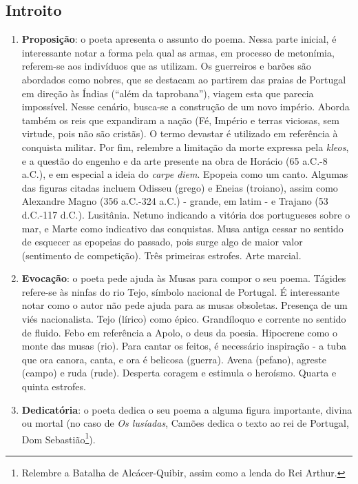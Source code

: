 \documentclass[12pt]{book}
\begin{document}
				\subsection{Introito} 			
 				\begin{enumerate}
 					\item \textbf{Proposição}: o poeta apresenta o assunto do poema. Nessa parte inicial, é interessante notar a forma pela qual as armas, em processo de metonímia, referem-se aos indivíduos que as utilizam. Os guerreiros e barões são abordados como nobres, que se destacam ao partirem das praias de Portugal em direção às Índias (``além da taprobana''), viagem esta que parecia impossível. Nesse cenário, busca-se a construção de um novo império. Aborda também os reis que expandiram a nação (Fé, Império e terras viciosas, sem virtude, pois não são cristãs). O termo devastar é utilizado em referência à conquista militar. Por fim, relembre a limitação da morte expressa pela \textit{kleos}, e a questão do engenho e da arte presente na obra de Horácio (65 a.C.-8 a.C.), e em especial a ideia do \textit{carpe diem}. Epopeia como um canto. Algumas das figuras citadas incluem Odisseu (grego) e Eneias (troiano), assim como Alexandre Magno (356 a.C.-324 a.C.) - grande, em latim - e Trajano (53 d.C.-117 d.C.). Lusitânia. Netuno indicando a vitória dos portugueses sobre o mar, e Marte como indicativo das conquistas. Musa antiga cessar no sentido de esquecer as epopeias do passado, pois surge algo de maior valor (sentimento de competição). Três primeiras estrofes. Arte marcial.
 					\item \textbf{Evocação}: o poeta pede ajuda às Musas para compor o seu poema. Tágides refere-se às ninfas do rio Tejo, símbolo nacional de Portugal. É interessante notar como o autor não pede ajuda para as musas obsoletas. Presença de um viés nacionalista. Tejo (lírico) como épico. Grandíloquo e corrente no sentido de fluido. Febo em referência a Apolo, o deus da poesia. Hipocrene como o monte das musas (rio). Para cantar os feitos, é necessário inspiração - a tuba que ora canora, canta, e ora é belicosa (guerra). Avena (pefano), agreste (campo) e ruda (rude). Desperta coragem e estimula o heroísmo. Quarta e quinta estrofes.
 					\item \textbf{Dedicatória}: o poeta dedica o seu poema a alguma figura importante, divina ou mortal (no caso de \textit{Os lusíadas}, Camões dedica o texto ao rei de Portugal, Dom Sebastião\footnote{Relembre a Batalha de Alcácer-Quibir, assim como a lenda do Rei Arthur.}).
 				\end{enumerate}
\end{document}
